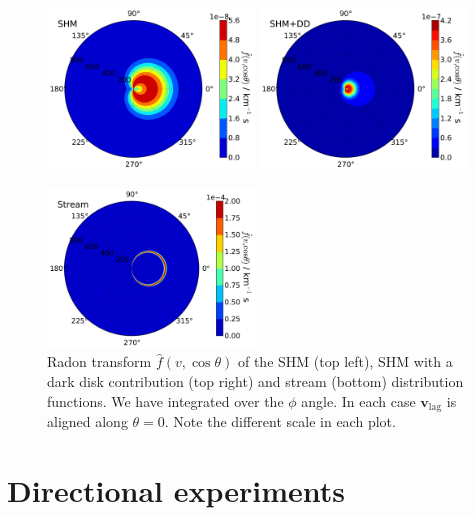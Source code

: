 \begin{figure}[ht!]
  \centering
  \includegraphics[width=0.49\textwidth]{Directional/SHMRadonpolar.pdf}
  \includegraphics[width=0.49\textwidth]{Directional/SHMDDRadonpolar.pdf}

  \includegraphics[width=0.49\textwidth]{Directional/STREAMRadonpolar.pdf}

\caption[Radon transform examples]{Radon transform $\hat{f}(v, \cos\theta)$ of the SHM (top left), SHM with a dark disk contribution (top right) and stream (bottom) distribution functions. We have integrated over the $\phi$ angle. In each case $\mathbf{v}_\textrm{lag}$ is aligned along $\theta = 0$. Note the different scale in each plot.}
  \label{fig:directional:Radon}
\end{figure}


\section{Directional experiments}
\label{sec:directional:experiments}

